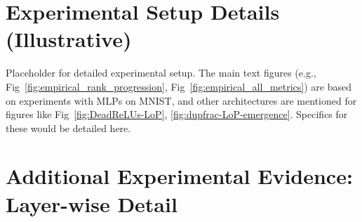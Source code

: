 \documentclass{article}
\begin{document}
\section{Experimental Setup Details (Illustrative)}
\label{app:exp_setup}

Placeholder for detailed experimental setup. The main text figures (e.g., Fig~\ref{fig:empirical_rank_progression}, Fig~\ref{fig:empirical_all_metrics}) are based on experiments with MLPs on MNIST, and other architectures are mentioned for figures like Fig~\ref{fig:DeadReLUs-LoP}, \ref{fig:dupfrac-LoP-emergence}. Specifics for these would be detailed here.

\section{Additional Experimental Evidence: Layer-wise Detail}
\label{app:additional_layer_detail}
\end{document}
